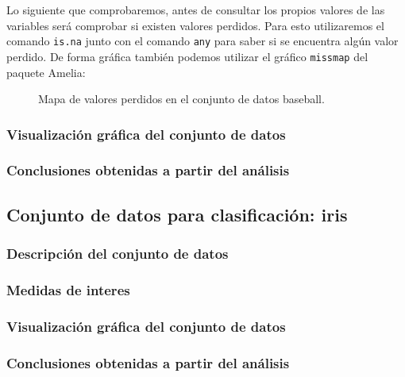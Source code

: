 Lo siguiente que comprobaremos, antes de consultar los propios valores de las variables será comprobar si existen valores perdidos. Para esto utilizaremos el comando \texttt{is.na} junto con el comando \texttt{any} para saber si se encuentra algún valor perdido. De forma gráfica también podemos utilizar el gráfico \texttt{missmap} del paquete Amelia:

\begin{figure}[H]
	\centering
	
	\caption{Mapa de valores perdidos en el conjunto de datos baseball.}
	\label{fig:missmap_iris}
\end{figure}

\subsubsection{Visualización gráfica del conjunto de datos}

\subsubsection{Conclusiones obtenidas a partir del análisis}



\subsection{Conjunto de datos para clasificación: iris}

\subsubsection{Descripción del conjunto de datos}

\subsubsection{Medidas de interes}

\subsubsection{Visualización gráfica del conjunto de datos}

\subsubsection{Conclusiones obtenidas a partir del análisis}
